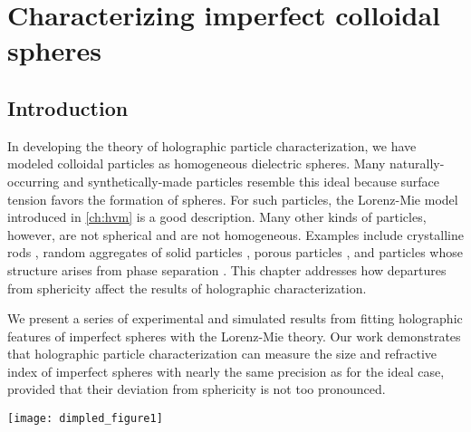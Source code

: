 \chapter{Characterizing imperfect colloidal spheres}
\label{ch:dimpled}

\section{Introduction}
In developing the theory of holographic particle characterization, we have modeled
colloidal particles as homogeneous
dielectric spheres. Many naturally-occurring and synthetically-made particles
resemble this ideal because surface tension favors the formation of spheres.
For such particles, the Lorenz-Mie model introduced in \autoref{ch:hvm} is a
good description. Many other kinds of particles, however, are not spherical and
are not homogeneous. Examples include crystalline rods \cite{fraden1995,cheong10},
random aggregates of solid particles \cite{witten1981,wang16a},
porous particles \cite{dimon1986,cheong11}, and particles whose
structure arises from phase separation \cite{kim15}.
This chapter addresses how departures from sphericity
affect the results of holographic characterization.

We present a series of experimental and simulated results from fitting
holographic features of imperfect spheres with the Lorenz-Mie theory.
Our work demonstrates that holographic particle characterization
can measure the size and refractive index
of imperfect spheres with nearly the same precision as for the ideal
case, provided that their
deviation from sphericity is not too pronounced. 

\begin{figure*}[t]
  \centering
  \texttt{[image: dimpled\_figure1]}
  \caption{(a) Scanning electron micrograph of a colloidal TPM sphere and 
    (b) a dimpled sphere.  Scale bars represent \SI{500}{\nm}.
    (c) and (d) Corresponding holograms for
    particles from the samples show in (a) and (b).  (e) \num{5000} measurements
    of sphere radius and refractive index for a single
    TPM sphere held in an optical tweezer.  Each point represents
    a single measurement, and is colored according to the
    relative density of measurements, $P(a_p,n_p)$.  (f) Equivalent result for
    a dimpled sphere.  (g) \num{5000} measurements of the radius and
    refractive index of a freely diffusing sphere.  (h) Equivalent
    result for a dimpled sphere \cite{hannel15}.
   }
  \label{fig:singleparticle}
\end{figure*}

